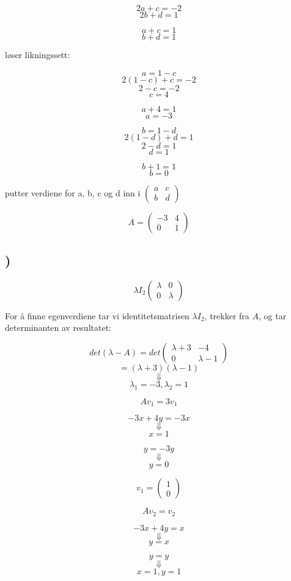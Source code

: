 \documentclass[a4paper,10pt,norsk]{article}
\begin{document}
\[2a + c = -2\]
\[2b + d = 1\]

\[a + c = 1\]
\[b + d = 1\]

løser likningssett:

\[a = 1 - c\]
\[2(1-c) + c = -2\]
\[2 - c = -2\]
\[c = 4\]

\[a + 4 = 1\]
\[a = -3\]

\[b = 1 - d\]
\[2(1 - d) + d = 1\]
\[2 - d = 1\]
\[d = 1\]

\[b + 1 = 1\]
\[b = 0\]

putter verdiene for a, b, c og d inn i $\left(\begin{matrix}a&c\\b&d\end{matrix}\right)$

\[A = \left(\begin{matrix}-3&4\\0&1\end{matrix}\right)\]

\subsection{)}

\[\lambda I_{2} \left(\begin{matrix}\lambda&0\\0&\lambda\end{matrix}\right)\]

For å finne egenverdiene tar vi identitetsmatrisen $\lambda I_{2}$, trekker fra $A$, og tar determinanten av resultatet:
 
\[det(\lambda - A) = det\left(\begin{matrix}\lambda + 3&-4\\0&\lambda - 1\end{matrix}\right)\]
\[ = (\lambda + 3)(\lambda - 1) \]
\[\Downarrow\]
\[\lambda_{1} = -3, \lambda_{2} = 1\]

\[Av_{1} = 3v_{1}\]

\[-3x + 4y = -3x\] 
\[\Downarrow\]
\[x = 1\]

\[y = -3y\]
\[\Downarrow\]
\[y = 0\]

\[v_{1} = \left(\begin{matrix} 1\\0 \end{matrix}\right)\]

\[Av_{2} = v_{2}\]

\[-3x+4y = x\]
\[\Downarrow\]
\[y = x\]

\[y = y\]
\[\Downarrow\]
\[x = 1, y = 1\]
\end{document}
